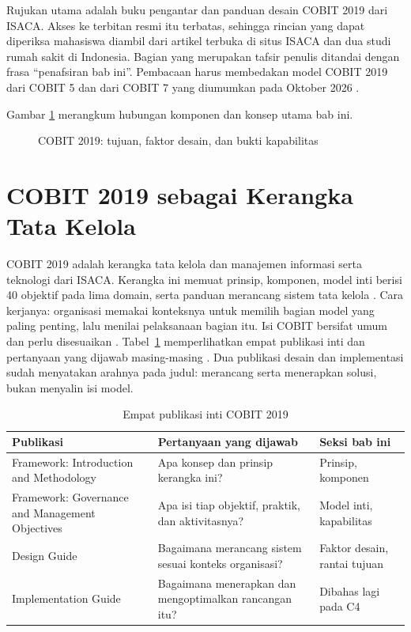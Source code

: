 Rujukan utama adalah buku pengantar dan panduan desain COBIT 2019 dari ISACA. Akses ke
terbitan resmi itu terbatas, sehingga rincian yang dapat diperiksa mahasiswa diambil dari
artikel terbuka di situs ISACA dan dua studi rumah sakit di Indonesia. Bagian yang merupakan
tafsir penulis ditandai dengan frasa ``penafsiran bab ini''. Pembacaan harus membedakan
model COBIT 2019 dari COBIT 5 dan dari COBIT 7 yang diumumkan pada Oktober 2026
\cite{cobit2019-intro,cobit2019-design,c04-perbandingan,c04-denpasar,c04-wilujeng,c04-transisi}.

Gambar \ref{fig:ch04-ilustrasi-bab} merangkum hubungan komponen dan konsep utama bab ini.
\begin{figure}[!htb]
  \centering
  
  \caption{COBIT 2019: tujuan, faktor desain, dan bukti kapabilitas}
  \label{fig:ch04-ilustrasi-bab}
\end{figure}

\section{COBIT 2019 sebagai Kerangka Tata Kelola}

COBIT 2019 adalah kerangka tata kelola dan manajemen informasi serta teknologi dari ISACA.
Kerangka ini memuat prinsip, komponen, model inti berisi 40 objektif pada lima domain, serta
panduan merancang sistem tata kelola \cite{c04-baru,c04-halaman}. Cara kerjanya: organisasi
memakai konteksnya untuk memilih bagian model yang paling penting, lalu menilai pelaksanaan
bagian itu. Isi COBIT bersifat umum dan perlu disesuaikan \cite{c04-sistematis}.
Tabel~\ref{tab:ch04-publikasi} memperlihatkan empat publikasi inti dan pertanyaan yang
dijawab masing-masing \cite{cobit2019-intro,c04-gmo,cobit2019-design,c04-implementasi}. Dua
publikasi desain dan implementasi sudah menyatakan arahnya pada judul: merancang serta
menerapkan solusi, bukan menyalin isi model.

\begin{table}[!htb]
  \centering\small
  \caption{Empat publikasi inti COBIT 2019}\label{tab:ch04-publikasi}
  \begin{tabularx}{\textwidth}{|>{\raggedright\arraybackslash}p{}|>{\raggedright\arraybackslash}X|>{\raggedright\arraybackslash}p{}|}
    \hline
    \textbf{Publikasi} & \textbf{Pertanyaan yang dijawab} & \textbf{Seksi bab ini} \\ \hline
    Framework: Introduction and Methodology & Apa konsep dan prinsip kerangka ini? & Prinsip,
    komponen \\ \hline
    Framework: Governance and Management Objectives & Apa isi tiap objektif, praktik, dan
    aktivitasnya? & Model inti, kapabilitas \\ \hline
    Design Guide & Bagaimana merancang sistem sesuai konteks organisasi? & Faktor desain, rantai
    tujuan \\ \hline
    Implementation Guide & Bagaimana menerapkan dan mengoptimalkan rancangan itu? & Dibahas lagi
    pada C4 \\ \hline
  \end{tabularx}
\end{table}

